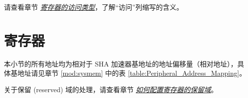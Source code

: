 \documentclass[main\_\_CN.tex]{subfiles}
\begin{document}
请查看章节 \hyperref[glossary-access-types]{\textit{寄存器的访问类型}}，了解“访问”列缩写的含义。



\newpage

\section{寄存器}

本小节的所有地址均为相对于 SHA 加速器基地址的地址偏移量（相对地址），具体基地址请见章节 \ref{mod:sysmem} \textit{} 中的表 \ref{table:Peripheral_Address_Mapping}。

关于保留 (reserved) 域的处理，请查看章节 \hyperref[programming-reserved-field]{\textit{如何配置寄存器的保留域}}。


\end{document}
